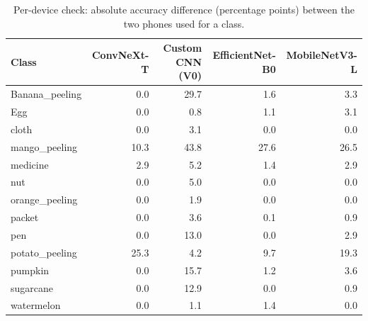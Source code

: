 \begin{table}
\caption{Per-device check: absolute accuracy difference (percentage points) between the two phones used for a class.}
\label{tab:table_device_check}
\begin{tabular}{lrrrr}
\toprule
Class & ConvNeXt-T & Custom CNN (V0) & EfficientNet-B0 & MobileNetV3-L \\
\midrule
Banana\_peeling & 0.0 & 29.7 & 1.6 & 3.3 \\
Egg & 0.0 & 0.8 & 1.1 & 3.1 \\
cloth & 0.0 & 3.1 & 0.0 & 0.0 \\
mango\_peeling & 10.3 & 43.8 & 27.6 & 26.5 \\
medicine & 2.9 & 5.2 & 1.4 & 2.9 \\
nut & 0.0 & 5.0 & 0.0 & 0.0 \\
orange\_peeling & 0.0 & 1.9 & 0.0 & 0.0 \\
packet & 0.0 & 3.6 & 0.1 & 0.9 \\
pen & 0.0 & 13.0 & 0.0 & 2.9 \\
potato\_peeling & 25.3 & 4.2 & 9.7 & 19.3 \\
pumpkin & 0.0 & 15.7 & 1.2 & 3.6 \\
sugarcane & 0.0 & 12.9 & 0.0 & 0.9 \\
watermelon & 0.0 & 1.1 & 1.4 & 0.0 \\
\bottomrule
\end{tabular}
\end{table}

